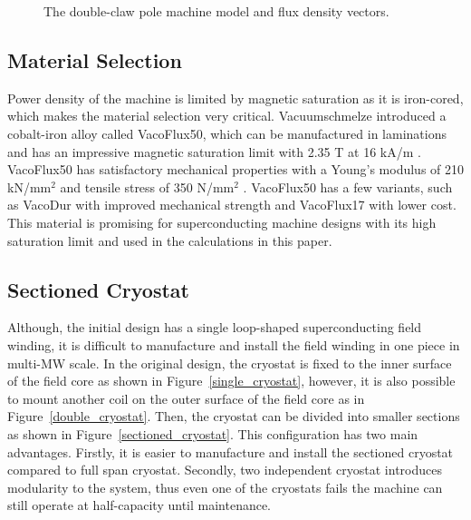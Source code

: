 \documentclass[12pt]{iopart}
\begin{document}
\begin{figure}[]
  \caption{The double-claw pole machine model and flux density vectors.} 
  \label{double_claw_parts}
\end{figure}

\subsection{Material Selection}

Power density of the machine is limited by magnetic saturation as it is iron-cored, which makes the material selection very critical.  Vacuumschmelze introduced a cobalt-iron alloy called VacoFlux50, which can be manufactured in laminations and has an impressive magnetic saturation limit with 2.35 T at 16 kA/m \cite{vacoflux}. VacoFlux50 has satisfactory mechanical properties with a Young's modulus of 210 kN/mm$^2$ and tensile stress of 350 N/mm$^2$ \cite{vacoflux}.  VacoFlux50 has a few variants, such as VacoDur with improved mechanical strength and VacoFlux17 with lower cost. This material is promising for superconducting machine designs with its high saturation limit and used in the calculations in this paper. 

\subsection{Sectioned Cryostat}

Although, the initial design has a single loop-shaped superconducting field winding, it is difficult to manufacture and install the field winding in one piece in multi-MW scale. In the original design, the cryostat is fixed to the inner surface of the field core as shown in Figure~\ref{single_cryostat}, however, it is also possible to mount another coil on the outer surface of the field core as in Figure~\ref{double_cryostat}. Then, the cryostat can be divided into smaller sections as shown in Figure~\ref{sectioned_cryostat}. This configuration has two main advantages. Firstly, it is easier to manufacture and install the sectioned cryostat compared to full span cryostat. Secondly, two independent cryostat introduces modularity to the system, thus even one of the cryostats fails  the machine can still operate at half-capacity until maintenance.
 
\end{document}
